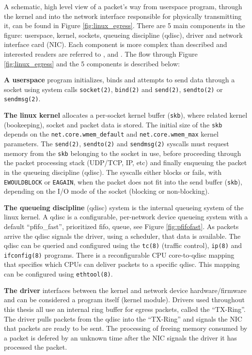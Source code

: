 A schematic, high level view of a packet's way from  userspace program,
through the kernel and into the network interface responsible  for physically
transmitting it, can be found in Figure \ref{fig:linux_egress}.  There are 5
main components in the figure: userspace, kernel, sockets, queueing
discipline (qdisc), driver and network interface card (NIC). Each component is
more complex than described and interested readers are referred to
\cite{knet}, \cite{pcsending} and \cite[Chapter~17]{ldd}. The flow through
Figure \ref{fig:linux_egress} and the 5 components is described below:

\textbf{A userspace} program initializes, binds and attempts to send
data through a socket using system calls \texttt{socket(2)}, \texttt{bind(2)}
and \texttt{send(2)}, \texttt{sendto(2)} or \texttt{sendmsg(2)}.

\textbf{The linux kernel} allocates a per-socket kernel buffer
(\texttt{skb}),  where related kernel (bookeeping), socket and packet data is
stored. The initial size of the \texttt{skb} depends on the
\texttt{net.core.wmem\_default} and  \texttt{net.core.wmem\_max} kernel
parameters. The \texttt{send(2)}, \texttt{sendto(2)} and  \texttt{sendmsg(2)}
syscalls must request memory from the \texttt{skb} belonging to the  socket
in use, before proceeding through the packet processing stack (UDP/TCP, IP,
etc)  and finally enqueuing the packet in the queueing discipline (qdisc). The
syscalls either blocks or fails, with \texttt{EWOULDBLOCK} or \texttt{EAGAIN},
when the  packet does not fit into the send buffer (\texttt{skb}), depending
on the I/O  mode of the socket (blocking or non-blocking).

\textbf{The queueing discipline} (qdisc) system is the internal
queueing system  of the linux kernel. A qdisc is a configurable, per-network
device queueing system with a  default ``pfifo\_fast'', prioritized fifo,
queue, see Figure \ref{fig:pfifofast}. As  packets arrive the qdisc signals
the driver, using a scheduler, that data is available.  The qdisc can be
queried and configured using the \texttt{tc(8)} (traffic control),
\texttt{ip(8)} and \texttt{ifconfig(8)} programs. There is a reconfigurable
CPU core-to-qdisc mapping that specifies which CPUs can deliver packets to
a specific qdisc. This mapping can be configured using \texttt{ethtool(8)}.

\textbf{The driver} interfaces between the kernel and network device
hardware/firmware and can be considered a program itself (kernel module).
Drivers used throughout this thesis all use an internal ring buffer for egress
packets, called the ``TX-Ring''. The driver pulls packets from the qdisc into
the ``TX-Ring'' and signals the NIC that packets are ready to be sent. The
processing of freeing memory consumed by a packet is defered by an unknown
time after the NIC signals the driver it has processed the packet.

